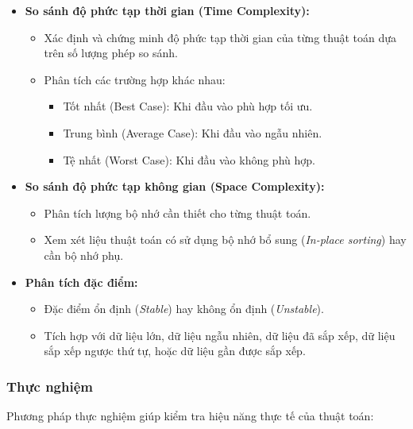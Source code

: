 \begin{itemize}
    \item \textbf{So sánh độ phức tạp thời gian (Time Complexity):}
    \begin{itemize}
        \item Xác định và chứng minh độ phức tạp thời gian của từng thuật toán dựa trên số lượng phép so sánh.
        \item Phân tích các trường hợp khác nhau:
        \begin{itemize}
            \item Tốt nhất (Best Case): Khi đầu vào phù hợp tối ưu.
            \item Trung bình (Average Case): Khi đầu vào ngẫu nhiên.
            \item Tệ nhất (Worst Case): Khi đầu vào không phù hợp.
        \end{itemize}
    \end{itemize}
    
    \item \textbf{So sánh độ phức tạp không gian (Space Complexity):}
    \begin{itemize}
        \item Phân tích lượng bộ nhớ cần thiết cho từng thuật toán.
        \item Xem xét liệu thuật toán có sử dụng bộ nhớ bổ sung (\textit{In-place sorting}) hay cần bộ nhớ phụ.
    \end{itemize}
    
    \item \textbf{Phân tích đặc điểm:}
    \begin{itemize}
        \item Đặc điểm ổn định (\textit{Stable}) hay không ổn định (\textit{Unstable}).
        \item Tích hợp với dữ liệu lớn, dữ liệu ngẫu nhiên, dữ liệu đã sắp xếp, dữ liệu sắp xếp ngược thứ tự, hoặc dữ liệu gần được sắp xếp.
    \end{itemize}
\end{itemize}

\subsubsection{Thực nghiệm}
Phương pháp thực nghiệm giúp kiểm tra hiệu năng thực tế của thuật toán:

